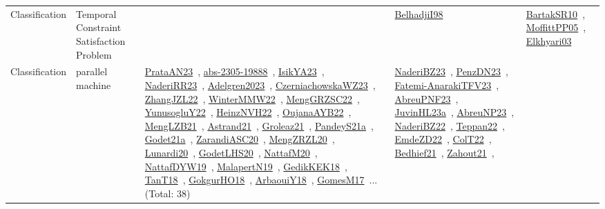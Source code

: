 {\begin{longtable}{lp{3cm}>{\raggedright\arraybackslash}p{6cm}>{\raggedright\arraybackslash}p{6cm}>{\raggedright\arraybackslash}p{8cm}}
\index{Temporal Constraint Satisfaction Problem}\index{Classification!Temporal Constraint Satisfaction Problem}Classification & Temporal Constraint Satisfaction Problem &  & \href{../works/BelhadjiI98.pdf}{BelhadjiI98}~\cite{BelhadjiI98} & \href{../works/BartakSR10.pdf}{BartakSR10}~\cite{BartakSR10}, \href{../works/MoffittPP05.pdf}{MoffittPP05}~\cite{MoffittPP05}, \href{../works/Elkhyari03.pdf}{Elkhyari03}~\cite{Elkhyari03}\\
\index{parallel machine}\index{Classification!parallel machine}Classification & parallel machine & \href{../works/PrataAN23.pdf}{PrataAN23}~\cite{PrataAN23}, \href{../works/abs-2305-19888.pdf}{abs-2305-19888}~\cite{abs-2305-19888}, \href{../works/IsikYA23.pdf}{IsikYA23}~\cite{IsikYA23}, \href{../works/NaderiRR23.pdf}{NaderiRR23}~\cite{NaderiRR23}, \href{../works/Adelgren2023.pdf}{Adelgren2023}~\cite{Adelgren2023}, \href{../works/CzerniachowskaWZ23.pdf}{CzerniachowskaWZ23}~\cite{CzerniachowskaWZ23}, \href{../works/ZhangJZL22.pdf}{ZhangJZL22}~\cite{ZhangJZL22}, \href{../works/WinterMMW22.pdf}{WinterMMW22}~\cite{WinterMMW22}, \href{../works/MengGRZSC22.pdf}{MengGRZSC22}~\cite{MengGRZSC22}, \href{../works/YunusogluY22.pdf}{YunusogluY22}~\cite{YunusogluY22}, \href{../works/HeinzNVH22.pdf}{HeinzNVH22}~\cite{HeinzNVH22}, \href{../works/OujanaAYB22.pdf}{OujanaAYB22}~\cite{OujanaAYB22}, \href{../works/MengLZB21.pdf}{MengLZB21}~\cite{MengLZB21}, \href{../works/Astrand21.pdf}{Astrand21}~\cite{Astrand21}, \href{../works/Groleaz21.pdf}{Groleaz21}~\cite{Groleaz21}, \href{../works/PandeyS21a.pdf}{PandeyS21a}~\cite{PandeyS21a}, \href{../works/Godet21a.pdf}{Godet21a}~\cite{Godet21a}, \href{../works/ZarandiASC20.pdf}{ZarandiASC20}~\cite{ZarandiASC20}, \href{../works/MengZRZL20.pdf}{MengZRZL20}~\cite{MengZRZL20}, \href{../works/Lunardi20.pdf}{Lunardi20}~\cite{Lunardi20}, \href{../works/GodetLHS20.pdf}{GodetLHS20}~\cite{GodetLHS20}, \href{../works/NattafM20.pdf}{NattafM20}~\cite{NattafM20}, \href{../works/NattafDYW19.pdf}{NattafDYW19}~\cite{NattafDYW19}, \href{../works/MalapertN19.pdf}{MalapertN19}~\cite{MalapertN19}, \href{../works/GedikKEK18.pdf}{GedikKEK18}~\cite{GedikKEK18}, \href{../works/TanT18.pdf}{TanT18}~\cite{TanT18}, \href{../works/GokgurHO18.pdf}{GokgurHO18}~\cite{GokgurHO18}, \href{../works/ArbaouiY18.pdf}{ArbaouiY18}~\cite{ArbaouiY18}, \href{../works/GomesM17.pdf}{GomesM17}~\cite{GomesM17}... (Total: 38) & \href{../works/NaderiBZ23.pdf}{NaderiBZ23}~\cite{NaderiBZ23}, \href{../works/PenzDN23.pdf}{PenzDN23}~\cite{PenzDN23}, \href{../works/Fatemi-AnarakiTFV23.pdf}{Fatemi-AnarakiTFV23}~\cite{Fatemi-AnarakiTFV23}, \href{../works/AbreuPNF23.pdf}{AbreuPNF23}~\cite{AbreuPNF23}, \href{../works/JuvinHL23a.pdf}{JuvinHL23a}~\cite{JuvinHL23a}, \href{../works/AbreuNP23.pdf}{AbreuNP23}~\cite{AbreuNP23}, \href{../works/NaderiBZ22.pdf}{NaderiBZ22}~\cite{NaderiBZ22}, \href{../works/Teppan22.pdf}{Teppan22}~\cite{Teppan22}, \href{../works/EmdeZD22.pdf}{EmdeZD22}~\cite{EmdeZD22}, \href{../works/ColT22.pdf}{ColT22}~\cite{ColT22}, \href{../works/Bedhief21.pdf}{Bedhief21}~\cite{Bedhief21}, \href{../works/Zahout21.pdf}{Zahout21}~\cite{Zahout21}, 
\end{longtable}}
